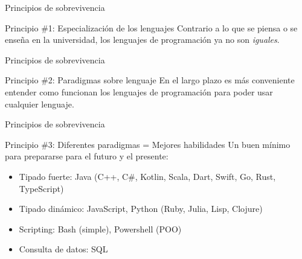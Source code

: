 \documentclass[aspectratio=169]{beamer}
\begin{document}
\begin{frame}{Principios de sobrevivencia}

	\begin{exampleblock}{Principio \#1: Especialización de los lenguajes}
    Contrario a lo que se piensa o se enseña en la universidad, los lenguajes de programación ya no son \textit{iguales}.
	\end{exampleblock}
\end{frame}


\begin{frame}{Principios de sobrevivencia}

	\begin{exampleblock}{Principio \#2: Paradigmas sobre lenguaje}
    En el largo plazo es más conveniente entender como funcionan los lenguajes de programación para poder usar cualquier lenguaje.
	\end{exampleblock}
\end{frame}

\begin{frame}{Principios de sobrevivencia}

	\begin{exampleblock}{Principio \#3: Diferentes paradigmas = Mejores habilidades}
    Un buen mínimo para prepararse para el futuro y el presente:
    \begin{itemize}
    	\item Tipado fuerte: Java (C++, C\#, Kotlin, Scala, Dart, Swift, Go, Rust, TypeScript)
        \item Tipado dinámico: JavaScript, Python (Ruby, Julia, Lisp, Clojure)
        \item Scripting: Bash (simple), Powershell (POO)
        \item Consulta de datos: SQL
   	\end{itemize}

	\end{exampleblock}
\end{frame}
\end{document}
